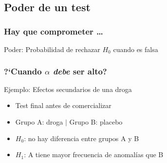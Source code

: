 \documentclass[gray,handout,mathserif]{beamer}
\begin{document}


\subsection[Poder]{Poder de un test}

\begin{frame}[label=power1]
   \frametitle{Hay que comprometer \ldots}
   \begin{beamerboxesrounded}{}
      Poder: Probabilidad de rechazar $H_0$ cuando es falsa
   \end{beamerboxesrounded}
\end{frame}%


\begin{frame}[label=betahigh1]
   \frametitle{?`Cuando $\alpha$ \emph{debe} ser alto?}
   \begin{exampleblock}{Ejemplo: Efectos secundarios de una droga}
      \begin{itemize}
         \item Test final antes de comercializar
         \item Grupo A: droga $|$ Grupo B: placebo
         \item $H_0$: no hay diferencia entre grupos A y B
         \item $H_1$: A tiene mayor frecuencia de anomal\'ias que B
      \end{itemize}
   \end{exampleblock}
\end{frame}%
\end{document}

